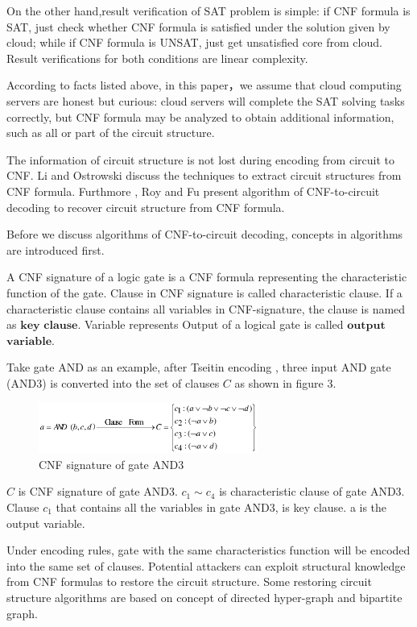 \documentclass[runningheads,a4paper]{llncs}
\begin{document}
On the other hand,result verification of SAT problem is simple: if CNF formula is SAT, just check whether CNF formula is satisfied under the solution given by cloud;
while if CNF formula is UNSAT, just get unsatisfied core from cloud. Result verifications for both conditions are linear complexity.

According to facts listed above, in this paper，we assume that cloud computing servers are honest but curious:
cloud servers will complete the SAT solving tasks correctly, but CNF formula may be analyzed to obtain additional information, such as all or part of the circuit structure.

The information of circuit structure is not lost during encoding from circuit to CNF. Li \cite{t6} and Ostrowski \cite{t7} discuss the techniques to extract circuit structures from CNF formula.
Furthmore , Roy \cite{t8} and Fu \cite{t9}  present algorithm of CNF-to-circuit decoding to recover circuit structure from CNF formula.

Before we discuss algorithms of CNF-to-circuit decoding, concepts in algorithms are introduced first.  




\begin{definition}
A CNF signature of a logic gate is a CNF formula representing the characteristic function of the gate.
Clause in CNF signature is called characteristic clause.
If a characteristic clause contains all variables in CNF-signature, the clause is named as $\mathbf{key}$ $\mathbf{clause}$.
Variable represents Output of a logical gate is called $\mathbf{output}$ $\mathbf{variable}$.
\end{definition}


Take gate AND as an example, after Tseitin encoding , three input AND gate (AND3) is converted into the set of clauses $C$ as shown in figure 3.
\begin{figure}
\centering
\includegraphics[width=7.2cm]{a3}
\caption{CNF signature of gate AND3 }
\end{figure}
$C$ is CNF signature of gate AND3. $c_1 \sim c_4$ is characteristic clause of gate AND3. 
Clause $c_1$ that contains all the variables in gate AND3, is key clause. a is the output variable.

Under encoding rules, gate with the same characteristics function will be encoded into the same set of clauses. 
Potential attackers can exploit structural knowledge from CNF formulas to restore the circuit structure. 
Some restoring circuit structure algorithms are based on concept of directed hyper-graph and bipartite graph.	
\end{document}
